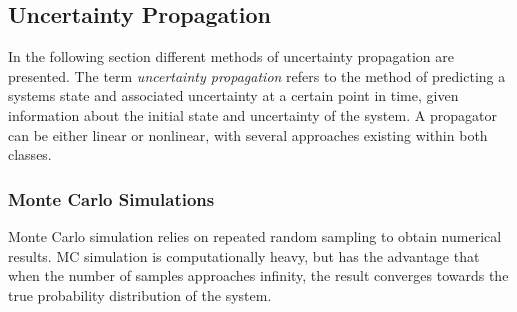 

\subsection{Uncertainty Propagation}

In the following section different methods of uncertainty propagation are presented. The term \textit{uncertainty propagation} refers to the method of predicting a systems state and associated uncertainty at a certain point in time, given information about the initial state and uncertainty of the system. A propagator can be either linear or nonlinear, with several approaches existing within both classes. \\


\subsubsection{Monte Carlo Simulations}

Monte Carlo simulation relies on repeated random sampling to obtain numerical results. MC simulation is computationally heavy, but has the advantage that when the number of samples approaches infinity, the result converges towards the true probability distribution of the system. \\


